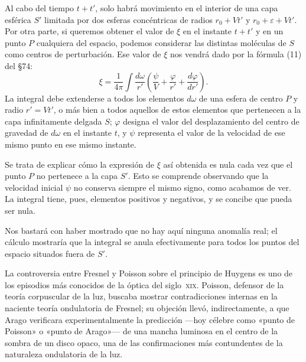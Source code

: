 Al cabo del tiempo $t+t'$, solo habrá movimiento en el interior de una capa
esférica $S'$ limitada por dos esferas concéntricas de radios $r_0+Vt'$ y
$r_0+\varepsilon+Vt'$. Por otra parte, si queremos obtener el valor de
$\xi$ en el instante $t+t'$ y en un punto $P$ cualquiera del espacio,
podemos considerar las distintas moléculas de $S$ como centros de
perturbación. Ese valor de $\xi$ nos vendrá dado por la fórmula (11) del
§74:
\[
\xi = \frac{1}{4\pi}\int \frac{d\omega}{r'}
\left(\frac{\psi}{V} + \frac{\varphi}{r'} + \frac{d\varphi}{dr'}\right).
\]
La integral debe extenderse a todos los elementos $d\omega$ de una esfera
de centro $P$ y radio $r'=Vt'$, o más bien a todos aquellos de estos
elementos que pertenecen a la capa infinitamente delgada $S$; $\varphi$
designa el valor del desplazamiento del centro de gravedad de $d\omega$ en
el instante $t$, y $\psi$ representa el valor de la velocidad de ese mismo
punto en ese mismo instante.

Se trata de explicar cómo la expresión de $\xi$ así obtenida es nula cada
vez que el punto $P$ no pertenece a la capa $S'$. Esto se comprende
observando que la velocidad inicial $\psi$ no conserva siempre el mismo
signo, como acabamos de ver. La integral tiene, pues, elementos positivos y
negativos, y se concibe que pueda ser nula.

Nos bastará con haber mostrado que no hay aquí ninguna anomalía real; el
cálculo mostraría que la integral se anula efectivamente para todos los
puntos del espacio situados fuera de $S'$.

\begin{notahistorica}
La controversia entre Fresnel y Poisson sobre el principio de Huygens es
uno de los episodios más conocidos de la óptica del siglo~\textsc{xix}.
Poisson, defensor de la teoría corpuscular de la luz, buscaba mostrar
contradicciones internas en la naciente teoría ondulatoria de Fresnel; su
objeción llevó, indirectamente, a que Arago verificara experimentalmente la
predicción —hoy célebre como «punto de Poisson» o «punto de Arago»— de
una mancha luminosa en el centro de la sombra de un disco opaco, una de las
confirmaciones más contundentes de la naturaleza ondulatoria de la luz.
\end{notahistorica}
